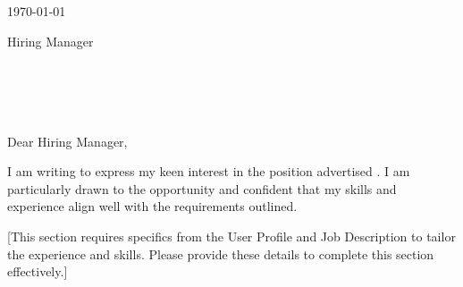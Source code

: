 \documentclass[letterpaper,11pt]{article}
\begin{document}

\today \\
\vspace{20pt}

Hiring Manager \\ %
 \\
 \\
 \\
 \\
\vspace{20pt}

Dear Hiring Manager, \\ %
\vspace{10pt}

\vspace{10pt}

I am writing to express my keen interest in the position advertised . I am particularly drawn to the opportunity and confident that my skills and experience align well with the requirements outlined.
\vspace{10pt}

\vspace{10pt}

[This section requires specifics from the User Profile and Job Description to tailor the experience and skills. Please provide these details to complete this section effectively.]
\vspace{10pt}
\end{document}
